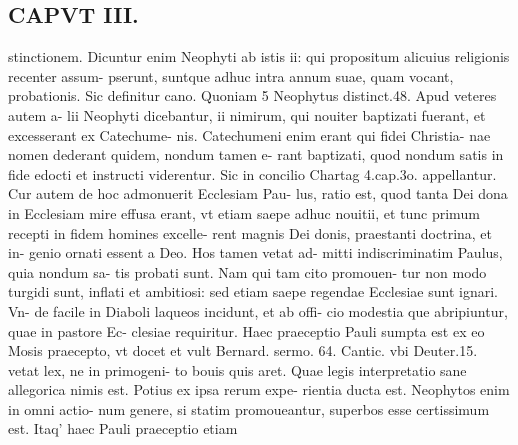 \documentclass{article}
\begin{document}
\begin{pages}
\section*{CAPVT  III. }
\marginpar{[ p.145 ]}\pstart stinctionem. Dicuntur enim Neophyti ab istis ii: qui propositum alicuius religionis recenter assum- pserunt, suntque adhuc intra annum suae, quam vocant, probationis. Sic definitur cano. Quoniam 5 Neophytus distinct.48. Apud veteres autem a- lii Neophyti dicebantur, ii nimirum, qui nouiter baptizati fuerant, et excesserant ex Catechume- nis. Catechumeni enim erant qui fidei Christia- nae nomen dederant quidem, nondum tamen e- rant baptizati, quod nondum satis in fide edocti et instructi viderentur. Sic in concilio Chartag 4.cap.3o. appellantur.  \pend\pstart Cur autem de hoc admonuerit Ecclesiam Pau- lus, ratio est, quod tanta Dei dona in Ecclesiam mire effusa erant, vt etiam saepe adhuc nouitii, et tunc primum recepti in fidem homines excelle- rent magnis Dei donis, praestanti doctrina, et in- genio ornati essent a Deo. Hos tamen vetat ad- mitti indiscriminatim Paulus, quia nondum sa- tis probati sunt. Nam qui tam cito promouen- tur non modo turgidi sunt, inflati et ambitiosi: sed etiam saepe regendae Ecclesiae sunt ignari. Vn- de facile in Diaboli laqueos incidunt, et ab offi- cio modestia que abripiuntur, quae in pastore Ec- clesiae requiritur.  \pend\pstart Haec praeceptio Pauli sumpta est ex eo Mosis praecepto, vt docet et vult Bernard. sermo. 64. Cantic. vbi Deuter.15. vetat lex, ne in primogeni- to bouis quis aret. Quae legis interpretatio sane allegorica nimis est. Potius ex ipsa rerum expe- rientia ducta est. Neophytos enim in omni actio- num genere, si statim promoueantur, superbos esse certissimum est. Itaq' haec Pauli praeceptio etiam  \pend

\end{pages}
\end{document}
